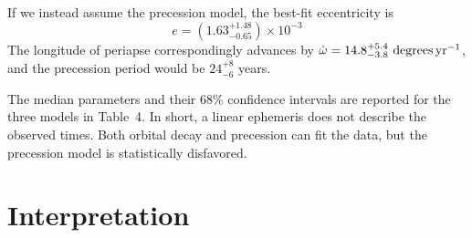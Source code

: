 \documentclass[12pt,twocolumn,tighten]{aastex62}
\begin{document}
If we instead assume the precession model, the best-fit eccentricity
is
\begin{equation}
  e = (1.63^{+ 1.48}_{- 0.65})\times10^{-3}
\end{equation}
The longitude of periapse correspondingly advances by $\dot{\omega}
= 14.8^{+5.4}_{-3.8}\ {\rm degrees}\,{\rm yr}^{-1}$, and the
precession period would be $24^{+8}_{-6}$ years.

The median parameters and their 68\% confidence intervals are reported
for the three models in Table~4.  In short, a linear ephemeris does
not describe the observed times.  Both orbital decay and precession
can fit the data, but the precession model is statistically
disfavored.


\section{Interpretation}
\label{sec:implications}
\end{document}
